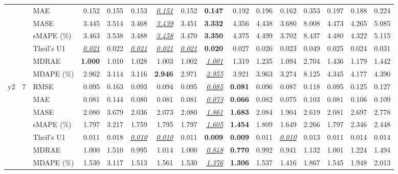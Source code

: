 \begin{table}[!htbp]
{\begin{tabular}{lllrrrrrrrrrrrrr}
 &  & MAE & 0.152 & 0.155 & 0.153 & \underline{\textit{0.151}} & 0.152 & \textbf{0.147} & 0.192 & 0.196 & 0.162 & 0.353 & 0.197 & 0.188 & 0.224 \\
 &  & MASE & 3.445 & 3.514 & 3.468 & \underline{\textit{3.439}} & 3.451 & \textbf{3.332} & 4.356 & 4.438 & 3.680 & 8.008 & 4.473 & 4.265 & 5.085 \\
 &  & sMAPE (\%) & 3.463 & 3.538 & 3.488 & \underline{\textit{3.458}} & 3.470 & \textbf{3.350} & 4.375 & 4.499 & 3.702 & 8.437 & 4.480 & 4.322 & 5.115 \\
 &  & Theil's U1 & \underline{\textit{0.021}} & 0.022 & \underline{\textit{0.021}} & \underline{\textit{0.021}} & \underline{\textit{0.021}} & \textbf{0.020} & 0.027 & 0.026 & 0.023 & 0.049 & 0.025 & 0.024 & 0.031 \\
 &  & MDRAE & \textbf{1.000} & 1.010 & 1.028 & 1.003 & 1.002 & \underline{\textit{1.001}} & 1.319 & 1.235 & 1.094 & 2.704 & 1.436 & 1.179 & 1.442 \\
 &  & MDAPE (\%) & 2.962 & 3.114 & 3.116 & \textbf{2.946} & 2.971 & \underline{\textit{2.955}} & 3.921 & 3.963 & 3.274 & 8.125 & 4.345 & 4.177 & 4.390 \\
\midrule
y2 & 7 & RMSE & 0.095 & 0.163 & 0.093 & 0.094 & 0.095 & \underline{\textit{0.085}} & \textbf{0.081} & 0.096 & 0.087 & 0.118 & 0.095 & 0.125 & 0.127 \\
 &  & MAE & 0.081 & 0.144 & 0.080 & 0.081 & 0.081 & \underline{\textit{0.073}} & \textbf{0.066} & 0.082 & 0.075 & 0.103 & 0.081 & 0.106 & 0.109 \\
 &  & MASE & 2.080 & 3.679 & 2.036 & 2.073 & 2.080 & \underline{\textit{1.861}} & \textbf{1.683} & 2.084 & 1.904 & 2.619 & 2.081 & 2.697 & 2.778 \\
 &  & sMAPE (\%) & 1.797 & 3.217 & 1.759 & 1.795 & 1.797 & \underline{\textit{1.605}} & \textbf{1.454} & 1.809 & 1.649 & 2.266 & 1.797 & 2.346 & 2.448 \\
 &  & Theil's U1 & 0.011 & 0.018 & \underline{\textit{0.010}} & \underline{\textit{0.010}} & 0.011 & \textbf{0.009} & \textbf{0.009} & 0.011 & \underline{\textit{0.010}} & 0.013 & 0.011 & 0.014 & 0.014 \\
 &  & MDRAE & 1.000 & 1.510 & 0.995 & 1.014 & 1.000 & \underline{\textit{0.848}} & \textbf{0.770} & 0.992 & 0.941 & 1.132 & 1.001 & 1.224 & 1.494 \\
 &  & MDAPE (\%) & 1.530 & 3.117 & 1.513 & 1.561 & 1.530 & \underline{\textit{1.376}} & \textbf{1.306} & 1.537 & 1.416 & 1.867 & 1.545 & 1.948 & 2.013 \\

\end{tabular}}
\end{table}
